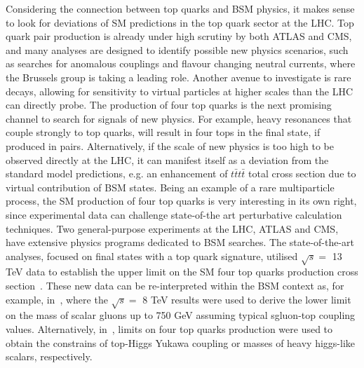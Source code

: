 \textcolor{\mynew}{
Considering the connection between top quarks and BSM physics, it makes sense to look for deviations of SM predictions in the top quark sector at the LHC. Top quark pair production is already under high scrutiny by both ATLAS and CMS, and many analyses are designed to identify possible new physics scenarios, such as searches for anomalous couplings and flavour changing neutral currents, where the Brussels group is taking a leading role. Another avenue to investigate is rare decays, allowing for sensitivity to virtual particles at higher scales than the LHC can directly probe. The production of four top quarks is the next promising channel to search for signals of new physics. For example, heavy resonances that couple strongly to top quarks, will result in four tops in the final state, if produced in pairs. Alternatively, if the scale of new physics is too high to be observed directly at the LHC, it can manifest itself as a deviation from the standard model predictions, e.g. an enhancement of $t\bar{t}t\bar{t}$ total cross section due to virtual contribution of BSM states. Being an example of a rare multiparticle process, the SM production of four top quarks is very interesting in its own right, since experimental data can challenge state-of-the art perturbative calculation techniques.
}
\textcolor{\mycolor}{
Two general-purpose experiments at the LHC, ATLAS and CMS, have extensive physics programs dedicated to BSM searches. The state-of-the-art analyses, focused on final states with a top quark signature, utilised $\sqrt{s}=$ 13 TeV data to establish the upper limit on the SM four top quarks production cross section~\cite{Aaboud:2017faq,Sirunyan:2017roi,Sirunyan:2017tep}. These new data can be re-interpreted within the BSM context as, for example, in~\cite{Beck:2015cga}, where %
the $\sqrt{s}=$ 8 TeV results were used to derive the lower limit on the mass of scalar gluons up to 750 GeV assuming typical sgluon-top coupling values. Alternatively, in~\cite{Cao:2016wib,Sirunyan:2017tep}, limits on four top quarks production were used to obtain the constrains of top-Higgs Yukawa coupling or masses of heavy higgs-like scalars, respectively.}

